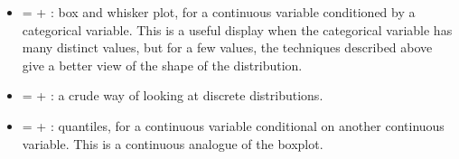\begin{itemize}
  \item {} =  + : box and whisker plot, for a continuous variable conditioned by a categorical variable.  This is a useful display when the categorical variable has many distinct values, but for a few values, the techniques described above give a better view of the shape of the distribution.
  
    
  
  \item {} =  + : a crude way of looking at discrete distributions.
  
    
  
  \item {} =  + : quantiles, for a continuous variable conditional on another continuous variable.  This is a continuous analogue of the boxplot. 
  
    
  

\end{itemize}
